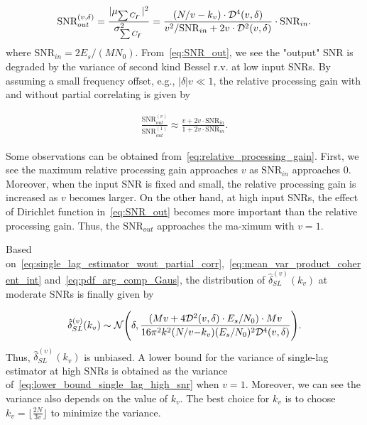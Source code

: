 \begin{equation}
  \begin{aligned}
    \label{eq:SNR_out}
    \text{SNR}_{out}^{(v,\delta)}=\frac{|\mu_{\sum C_{\digamma}}|^2}{\sigma^2_{\sum C_{\digamma}}} 
    =\frac{(N/v-k_v)\cdot\mathcal{D}^4(v,\delta)}
    {v^2/\text{SNR}_{in}+2v\cdot\mathcal{D}^2(v,\delta)}\cdot\text{SNR}_{in}. \\
  \end{aligned}
\end{equation}
where $\text{SNR}_{in}=2E_s/(MN_0)$. From~\eqref{eq:SNR_out}, we 
see the "output" SNR is degraded by the variance of second kind Bessel
r.v. at low input SNRs. By assuming a small frequency offset, e.g., $|\delta|v\ll 1$,
the relative processing gain with and without partial correlating is given by

\begin{equation}
  \begin{aligned}
    \label{eq:relative_processing_gain}
    \frac{\text{SNR}_{out}^{(v)}}{\text{SNR}_{out}^{(1)}} \approx\frac{v+2v\cdot\text{SNR}_{in}}{1+2v\cdot\text{SNR}_{in}}.
  \end{aligned}
\end{equation}

Some observations can be obtained from~\eqref{eq:relative_processing_gain}.
First, we see the maximum relative processing gain approaches $v$ as $\text{SNR}_{in}$ approaches 0. 
Moreover, when the input SNR is fixed and small, the relative processing gain
is increased as $v$ becomes larger.
On the other hand, at high input SNRs,
the effect of Dirichlet function in~\eqref{eq:SNR_out}
becomes more important than the relative processing gain.
Thus, the $\text{SNR}_{out}$ approaches the ma-ximum with
$v=1$.

Based on~\eqref{eq:single_lag_estimator_wout_partial_corr},~\eqref{eq:mean_var_product_coherent_int}
and~\eqref{eq:pdf_arg_comp_Gaus}, the distribution of $\hat{\delta}_{SL}^{(v)}(k_v)$ at moderate SNRs is finally given by

\begin{equation}
  \label{eq:lower_bound_single_lag_high_snr}
  \hat{\delta}_{SL}^{(v)}(k_v) \sim \mathcal{N} \Bigg(\delta,\frac{(Mv+4\mathcal{D}^2(v,\delta)\cdot E_s/N_0)\cdot Mv}{16\pi^2k^2(N/v{-}k_v)(E_s/N_0)^2\mathcal{D}^4(v,\delta)}\Bigg).
\end{equation}
Thus, $\hat{\delta}_{SL}^{(v)}(k_v)$ is unbiased. 
A lower bound for the variance of single-lag estimator at high SNRs is obtained
as the variance of~\eqref{eq:lower_bound_single_lag_high_snr} when $v=1$.
Moreover, we can see the variance also depends on
the value of $k_v$. The best choice for $k_v$ is to choose 
$k_v=\lfloor\frac{2N}{3v}\rfloor$ to minimize the variance.

